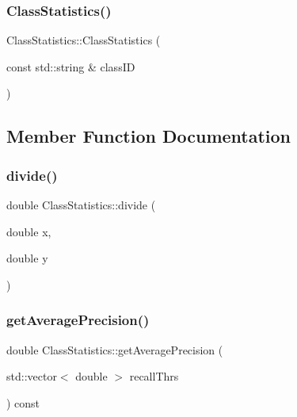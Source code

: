 \mbox{\label{struct_class_statistics_a0434f553802cd8ea436164281184c8e7}} 
\subsubsection{\texorpdfstring{Class\+Statistics()}{ClassStatistics()}\hspace{0.1cm}{\footnotesize\ttfamily [2/2]}}
{\footnotesize\ttfamily Class\+Statistics\+::\+Class\+Statistics (\begin{DoxyParamCaption}\item[{const std\+::string \&}]{class\+ID }\end{DoxyParamCaption})}



\subsection{Member Function Documentation}
\mbox{\label{struct_class_statistics_a66418a700e12730feb6ad54d81ba0a8e}} 
\subsubsection{\texorpdfstring{divide()}{divide()}}
{\footnotesize\ttfamily double Class\+Statistics\+::divide (\begin{DoxyParamCaption}\item[{double}]{x,  }\item[{double}]{y }\end{DoxyParamCaption})\hspace{0.3cm}{\ttfamily [static]}}

\mbox{\label{struct_class_statistics_af97e1c498a387e6762be460e61d0e610}} 
\subsubsection{\texorpdfstring{get\+Average\+Precision()}{getAveragePrecision()}}
{\footnotesize\ttfamily double Class\+Statistics\+::get\+Average\+Precision (\begin{DoxyParamCaption}\item[{std\+::vector$<$ double $>$}]{recall\+Thrs }\end{DoxyParamCaption}) const}

